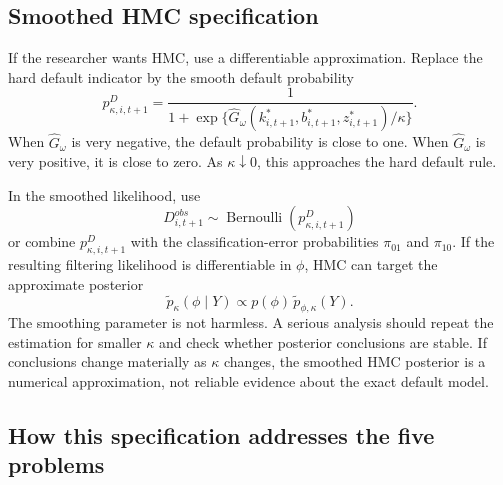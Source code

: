 \documentclass[11pt]{article}
\newcommand{\1}{\mathbf{1}}
\begin{document}
\subsection{Smoothed HMC specification}

If the researcher wants HMC, use a differentiable approximation. Replace the
hard default indicator by the smooth default probability
\begin{equation}
  p^D_{\kappa,i,t+1}
  =
  \frac{1}{1+\exp\{\widehat G_\omega(k^*_{i,t+1},b^*_{i,t+1},z^*_{i,t+1})/\kappa\}}.
  \label{eq:full-ssm-soft-default}
\end{equation}
When \(\widehat G_\omega\) is very negative, the default probability is close to
one. When \(\widehat G_\omega\) is very positive, it is close to zero. As
\(\kappa\downarrow0\), this approaches the hard default rule.

In the smoothed likelihood, use
\[
  D_{i,t+1}^{obs}
  \sim
  \operatorname{Bernoulli}(p^D_{\kappa,i,t+1})
\]
or combine \(p^D_{\kappa,i,t+1}\) with the classification-error probabilities
\(\pi_{01}\) and \(\pi_{10}\). If the resulting filtering likelihood is
differentiable in \(\phi\), HMC can target the approximate posterior
\begin{equation}
  \widetilde p_\kappa(\phi\mid Y)
  \propto
  p(\phi)\,\widetilde p_{\phi,\kappa}(Y).
  \label{eq:full-ssm-soft-posterior}
\end{equation}
The smoothing parameter is not harmless. A serious analysis should repeat the
estimation for smaller \(\kappa\) and check whether posterior conclusions are
stable. If conclusions change materially as \(\kappa\) changes, the smoothed
HMC posterior is a numerical approximation, not reliable evidence about the
exact default model.

\subsection{How this specification addresses the five problems}
\end{document}
